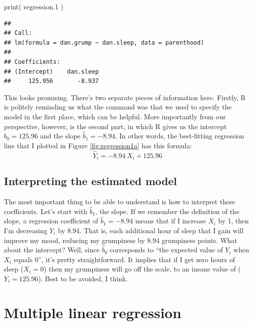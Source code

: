 \documentclass[
]{book}
\newenvironment{Shaded}{\begin{snugshade}}{\end{snugshade}}
\newcommand{\FloatTok}[1]{\textcolor[rgb]{0.00,0.00,0.81}{#1}}
\newcommand{\FunctionTok}[1]{\textcolor[rgb]{0.00,0.00,0.00}{#1}}
\newcommand{\NormalTok}[1]{#1}
\begin{document}
\begin{Shaded}
\begin{Highlighting}[]
\FunctionTok{print}\NormalTok{( regression}\FloatTok{.1}\NormalTok{ )}
\end{Highlighting}
\end{Shaded}

\begin{verbatim}
## 
## Call:
## lm(formula = dan.grump ~ dan.sleep, data = parenthood)
## 
## Coefficients:
## (Intercept)    dan.sleep  
##     125.956       -8.937
\end{verbatim}

This looks promising. There's two separate pieces of information here. Firstly, R is politely reminding us what the command was that we used to specify the model in the first place, which can be helpful. More importantly from our perspective, however, is the second part, in which R gives us the intercept \(\hat{b}_0 = 125.96\) and the slope \(\hat{b}_1 = -8.94\). In other words, the best-fitting regression line that I plotted in Figure \ref{fig:regression1a} has this formula:
\[
\hat{Y}_i = -8.94 \ X_i + 125.96
\]

\hypertarget{interpreting-the-estimated-model}{%
\subsection{Interpreting the estimated model}\label{interpreting-the-estimated-model}}

The most important thing to be able to understand is how to interpret these coefficients. Let's start with \(\hat{b}_1\), the slope. If we remember the definition of the slope, a regression coefficient of \(\hat{b}_1 = -8.94\) means that if I increase \(X_i\) by 1, then I'm decreasing \(Y_i\) by 8.94. That is, each additional hour of sleep that I gain will improve my mood, reducing my grumpiness by 8.94 grumpiness points. What about the intercept? Well, since \(\hat{b}_0\) corresponds to ``the expected value of \(Y_i\) when \(X_i\) equals 0'', it's pretty straightforward. It implies that if I get zero hours of sleep (\(X_i =0\)) then my grumpiness will go off the scale, to an insane value of (\(Y_i = 125.96\)). Best to be avoided, I think.

\hypertarget{multipleregression}{%
\section{Multiple linear regression}\label{multipleregression}}
\end{document}

